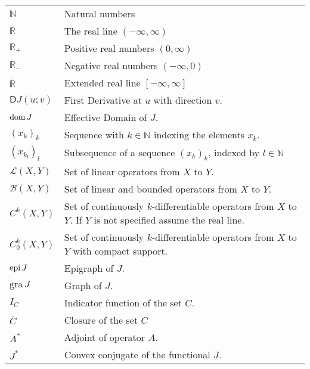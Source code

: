 \begin{tabular}{ll}
	$\mathbb{N}$ & Natural numbers \\
	$\mathbb{R}$ & The real line $(-\infty, \infty)$ \\
	$\mathbb{R}_+$ & Positive real numbers $(0,\infty)$ \\
	$\mathbb{R}_-$ & Negative real numbers $(-\infty,0)$ \\
	$\overline{\mathbb{R}}$ & Extended real line $[-\infty, \infty]$ \\
	$\mathsf{D} J(u;v)$ & First Derivative at $u$ with direction $v$. \\
	$\mathrm{dom\,} J$	& Effective Domain of $J$. \\
	$(x_k)_k$   & Sequence with $k \in \mathbb{N}$ indexing the elements $x_k$. \\
	$(x_{k_l})_l$ & Subsequence of a sequence $(x_k)_k$, indexed by $l \in \mathbb{N}$ \\
	$\mathcal{L}(X,Y)$ & Set of linear operators from $X$ to $Y$. \\
	$\mathcal{B}(X,Y)$ & Set of linear and bounded operators from $X$ to $Y$. \\
	$C^k(X,Y)$ & Set of continuously $k$-differentiable operators from $X$ to $Y$. If $Y$ is not specified assume the real line. \\
	$C^k_0(X,Y)$ & Set of continuously $k$-differentiable operators from $X$ to $Y$ with compact support. \\
	$\mathrm{epi\,} J$ & Epigraph of $J$. \\
	$\text{gra}\, J$ & Graph of $J$.\\
	$I_C$ & Indicator function of the set $C$. \\
	$\overline{C}$ & Closure of  the set $C$ \\
	$A^*$ & Adjoint of operator $A$.\\
	$J^*$ & Convex conjugate of the functional $J$.
\end{tabular}
